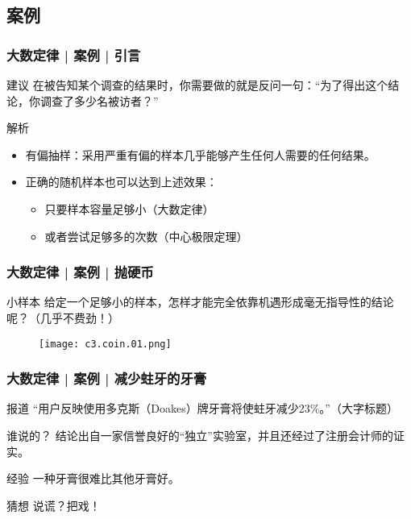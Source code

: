\subsection{案例}
\begin{frame}
  \frametitle{大数定律 | 案例 | 引言}
  \begin{block}{建议}
    在被告知某个调查的结果时，你需要做的就是反问一句：“为了得出这个结论，你调查了多少名被访者？”
  \end{block}
  \pause
  \begin{block}{解析}
    \begin{itemize}
      \item 有偏抽样：采用严重有偏的样本几乎能够产生任何人需要的任何结果。
      \item 正确的随机样本也可以达到上述效果：
        \begin{itemize}
          \item 只要样本容量足够小（大数定律）
          \item 或者尝试足够多的次数（中心极限定理）
        \end{itemize}
    \end{itemize}
  \end{block}
\end{frame}

\begin{frame}
  \frametitle{大数定律 | 案例 | 抛硬币}
  \begin{block}{小样本}
    给定一个足够小的样本，怎样才能完全依靠机遇形成毫无指导性的结论呢？（几乎不费劲！）
  \end{block}
  \begin{figure}
    \centering
    \texttt{[image: c3.coin.01.png]}
  \end{figure}
\end{frame}

\begin{frame}
  \frametitle{大数定律 | 案例 | 减少蛀牙的牙膏}
  \begin{block}{报道}
    “用户反映使用多克斯（Doakes）牌牙膏将使蛀牙减少23\%。”（大字标题）
  \end{block}
  \pause
  \begin{block}{谁说的？}
    结论出自一家信誉良好的“独立”实验室，并且还经过了注册会计师的证实。
  \end{block}
  \pause
  \begin{block}{经验}
    一种牙膏很难比其他牙膏好。
  \end{block}
  \pause
  \begin{block}{猜想}
    说谎？把戏！
  \end{block}
\end{frame}

